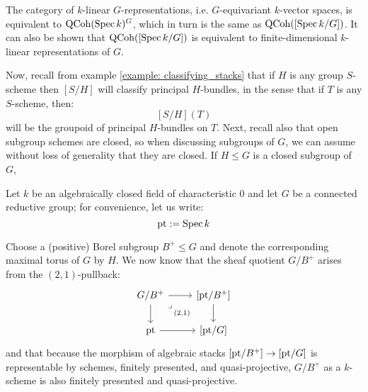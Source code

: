         \begin{example} \label{example: representations_as_sheaves_on_classifying_stacks}
            The category of $k$-linear $G$-representations, i.e. $G$-equivariant $k$-vector spaces, is equivalent to $\mathrm{QCoh}(\operatorname{Spec} k)^G$, which in turn is the same as $\mathrm{QCoh}([\operatorname{Spec} k/G])$. It can also be shown that $\mathrm{QCoh}([\operatorname{Spec} k/G])$ is equivalent to finite-dimensional $k$-linear representations of $G$.
        \end{example}

        Now, recall from example \ref{example: classifying_stacks} that if $H$ is any group $S$-scheme then $[S/H]$ will classify principal $H$-bundles, in the sense that if $T$ is any $S$-scheme, then:
            $$[S/H](T)$$
        will be the groupoid of principal $H$-bundles on $T$. Next, recall also that open subgroup schemes are closed, so when discussing subgroups of $G$, we can assume without loss of generality that they are closed. If $H \leq G$ is a closed subgroup of $G$,   

        \begin{example}
            Let $k$ be an algebraically closed field of characteristic $0$ and let $G$ be a connected reductive group; for convenience, let us write:
                $$\mathrm{pt} := \operatorname{Spec} k$$
            
            Choose a (positive) Borel subgroup $B^+ \leq G$ and denote the corresponding maximal torus of $G$ by $H$. We now know that the sheaf quotient $G/B^+$ arises from the $(2, 1)$-pullback:
                $$
                    \begin{tikzcd}
                    	{G/B^+} & {[\pt/B^+]} \\
                    	\pt & {[\pt/G]}
                    	\arrow[from=1-1, to=1-2]
                    	\arrow[from=1-1, to=2-1]
                    	\arrow["{(2, 1)}"{description}, "\lrcorner"{anchor=center, pos=0.125}, draw=none, from=1-1, to=2-2]
                    	\arrow[from=1-2, to=2-2]
                    	\arrow[from=2-1, to=2-2]
                    \end{tikzcd}
                $$
            and that because the morphism of algebraic stacks $[\mathrm{pt}/B^+] \to [\mathrm{pt}/G]$ is representable by schemes, finitely presented, and quasi-projective, $G/B^+$ as a $k$-scheme is also finitely presented and quasi-projective. 
        \end{example}

        \begin{example}
            
        \end{example}

